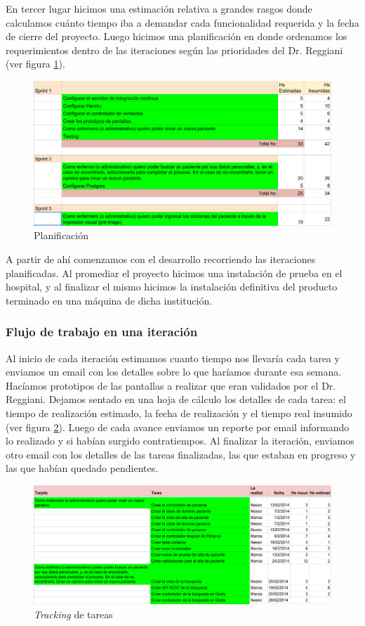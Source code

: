 En tercer lugar hicimos una estimación relativa a grandes rasgos donde calculamos cuánto tiempo iba a demandar cada funcionalidad requerida y la fecha de cierre del proyecto. Luego hicimos una planificación en donde ordenamos los requerimientos dentro de las iteraciones según las prioridades del Dr. Reggiani (ver figura \ref{fig:planificacion}).

\begin{figure}
  \centerline{\includegraphics[width=1.2\textwidth]{planificacion.png}}
  \caption{Planificación}
  \label{fig:planificacion}
\end{figure}

A partir de ahí comenzamos con el desarrollo recorriendo las iteraciones planificadas. Al promediar el proyecto hicimos una instalación de prueba en el hospital, y al finalizar el mismo hicimos la instalación definitiva del producto terminado en una máquina de dicha institución.

\subsubsection{Flujo de trabajo en una iteración}
Al inicio de cada iteración estimamos cuanto tiempo nos llevaría cada tarea y enviamos un email con los detalles sobre lo que haríamos durante esa semana. Hacíamos prototipos de las pantallas a realizar que eran validados por el Dr. Reggiani. Dejamos sentado en una hoja de cálculo los detalles de cada tarea: el tiempo de realización estimado, la fecha de realización y el tiempo real insumido (ver figura \ref{fig:tracking}). Luego de cada avance enviamos un reporte por email informando lo realizado y si habían surgido contratiempos. Al finalizar la iteración, enviamos otro email con los detalles de las tareas finalizadas, las que estaban en progreso y las que habían quedado pendientes.

\begin{figure}[h]
  \centerline{\includegraphics[width=1.2\textwidth]{tracking.png}}
  \caption{\textit{Tracking} de tareas}
  \label{fig:tracking}
\end{figure}


